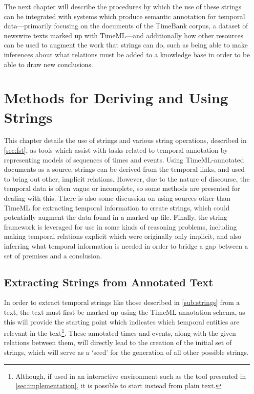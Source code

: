 \documentclass[a4paper,12pt,leqno]{article}
\begin{document}
The next chapter will describe the procedures by which the use of these strings can be integrated with systems which produce semantic annotation for temporal data---primarily focusing on the documents of the TimeBank corpus, a dataset of newswire texts marked up with TimeML---and additionally how other resources can be used to augment the work that strings can do, such as being able to make inferences about what relations must be added to a knowledge base in order to be able to draw new conclusions.

\newpage
\section{Methods for Deriving and Using Strings}\label{sec:methods}
This chapter details the use of strings and various string operations, described in \cref{sec:fst}, as tools which assist with tasks related to temporal annotation by representing models of sequences of times and events. Using TimeML-annotated documents as a source, strings can be derived from the temporal links, and used to bring out other, implicit relations. However, due to the nature of discourse, the temporal data is often vague or incomplete, so some methods are presented for dealing with this. There is also some discussion on using sources other than TimeML for extracting temporal information to create strings, which could potentially augment the data found in a marked up file. Finally, the string framework is leveraged for use in some kinds of reasoning problems, including making temporal relations explicit which were originally only implicit, and also inferring what temporal information is needed in order to bridge a gap between a set of premises and a conclusion.

\subsection{Extracting Strings from Annotated Text}\label{sub:extracting}
In order to extract temporal strings like those described in \cref{sub:strings} from a text, the text must first be marked up using the TimeML \citep{timeml2005timeml} annotation schema, as this will provide the starting point which indicates which temporal entities are relevant in the text\footnote{Although, if used in an interactive environment such as the tool presented in \cref{sec:implementation}, it is possible to start instead from plain text.}. These annotated times and events, along with the given relations between them, will directly lead to the creation of the initial set of strings, which will serve as a `seed' for the generation of all other possible strings.
\end{document}
